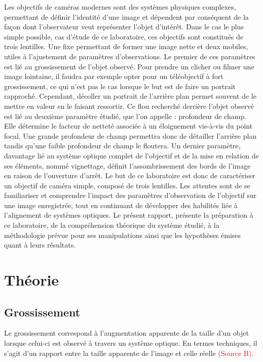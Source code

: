 \documentclass[11pt,letterpaper]{article}
\begin{document}
Les objectifs de caméras modernes sont des systèmes physiques complexes, permettant de définir l'identité d'une image et dépendent par conséquent de la façon dont l'observateur veut représenter l'objet d'intérêt. Dans le cas le plus simple possible, cas d'étude de ce laboratoire, ces objectifs sont constitués de trois lentilles. Une fixe permettant de former une image nette et deux mobiles, utiles à l'ajustement de paramètres d'observations. Le premier de ces paramètres est lié au grossissement de l'objet observé. Pour prendre un clicher ou filmer une image lointaine, il faudra par exemple opter pour un téléobjectif à fort grossissement, ce qui n'est pas le cas lorsque le but est de faire un portrait rapproché. Cependant, décoller un portrait de l'arrière plan permet souvent de le mettre en valeur en le faisant ressortir. Ce flou recherché derrière l'objet observé est lié au deuxième paramètre étudié, que l'on appelle : profondeur de champ. Elle détermine le facteur de netteté associée à un éloignement vis-à-vis du point focal. Une grande profondeur de champ permettra donc de détailler l'arrière plan tandis qu'une faible profondeur de champ le floutera. Un dernier paramètre, davantage lié au système optique complet de l'objectif et de la mise en relation de ses éléments, nommé vignettage, définit l'assombrissement des bords de l'image en raison de l'ouverture d'arrêt. Le but de ce laboratoire est donc de caractériser un objectif de caméra simple, composé de trois lentilles. Les attentes sont de se familiariser et comprendre l'impact des paramètres d'observation de l'objectif sur une image enregistrée, tout en continuant de développer des habilités liée à l'alignement de systèmes optiques. Le présent rapport, présente la préparation à ce laboratoire, de la compréhension théorique du système étudié, à la méthodologie prévue pour ses manipulations ainsi que les hypothèses émises quant à leurs résultats. 

\section{Théorie}

\subsection{Grossissement}
Le grossissement correspond à l'augmentation apparente de la taille d'un objet lorsque celui-ci est observé à travers un système optique. En termes techniques, il s'agit d'un rapport entre la taille apparente de l'image et celle réelle \textcolor{red}{(Source B)}. 
\end{document}
